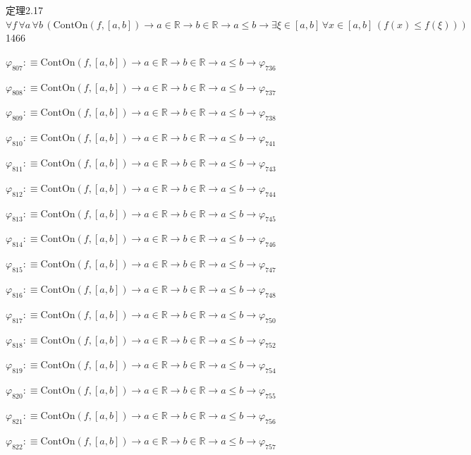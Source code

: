 \begin{fullproof}{定理2.17}{$\forall f\,\forall a\,\forall b\,(\mathrm{ContOn}(f,[a,b]) \to a \in \mathbb{R} \to b \in \mathbb{R} \to a \leq b \to \exists \xi \in [a,b]\,\forall x \in [a,b]\,(f(x) \leq f(\xi)))$}{1466}
\begin{abbrevlist}
\item $\varphi_{807} :\equiv \mathrm{ContOn}(f,[a,b]) \to a \in \mathbb{R} \to b \in \mathbb{R} \to a \leq b \to \varphi_{736}$
\item $\varphi_{808} :\equiv \mathrm{ContOn}(f,[a,b]) \to a \in \mathbb{R} \to b \in \mathbb{R} \to a \leq b \to \varphi_{737}$
\item $\varphi_{809} :\equiv \mathrm{ContOn}(f,[a,b]) \to a \in \mathbb{R} \to b \in \mathbb{R} \to a \leq b \to \varphi_{738}$
\item $\varphi_{810} :\equiv \mathrm{ContOn}(f,[a,b]) \to a \in \mathbb{R} \to b \in \mathbb{R} \to a \leq b \to \varphi_{741}$
\item $\varphi_{811} :\equiv \mathrm{ContOn}(f,[a,b]) \to a \in \mathbb{R} \to b \in \mathbb{R} \to a \leq b \to \varphi_{743}$
\item $\varphi_{812} :\equiv \mathrm{ContOn}(f,[a,b]) \to a \in \mathbb{R} \to b \in \mathbb{R} \to a \leq b \to \varphi_{744}$
\item $\varphi_{813} :\equiv \mathrm{ContOn}(f,[a,b]) \to a \in \mathbb{R} \to b \in \mathbb{R} \to a \leq b \to \varphi_{745}$
\item $\varphi_{814} :\equiv \mathrm{ContOn}(f,[a,b]) \to a \in \mathbb{R} \to b \in \mathbb{R} \to a \leq b \to \varphi_{746}$
\item $\varphi_{815} :\equiv \mathrm{ContOn}(f,[a,b]) \to a \in \mathbb{R} \to b \in \mathbb{R} \to a \leq b \to \varphi_{747}$
\item $\varphi_{816} :\equiv \mathrm{ContOn}(f,[a,b]) \to a \in \mathbb{R} \to b \in \mathbb{R} \to a \leq b \to \varphi_{748}$
\item $\varphi_{817} :\equiv \mathrm{ContOn}(f,[a,b]) \to a \in \mathbb{R} \to b \in \mathbb{R} \to a \leq b \to \varphi_{750}$
\item $\varphi_{818} :\equiv \mathrm{ContOn}(f,[a,b]) \to a \in \mathbb{R} \to b \in \mathbb{R} \to a \leq b \to \varphi_{752}$
\item $\varphi_{819} :\equiv \mathrm{ContOn}(f,[a,b]) \to a \in \mathbb{R} \to b \in \mathbb{R} \to a \leq b \to \varphi_{754}$
\item $\varphi_{820} :\equiv \mathrm{ContOn}(f,[a,b]) \to a \in \mathbb{R} \to b \in \mathbb{R} \to a \leq b \to \varphi_{755}$
\item $\varphi_{821} :\equiv \mathrm{ContOn}(f,[a,b]) \to a \in \mathbb{R} \to b \in \mathbb{R} \to a \leq b \to \varphi_{756}$
\item $\varphi_{822} :\equiv \mathrm{ContOn}(f,[a,b]) \to a \in \mathbb{R} \to b \in \mathbb{R} \to a \leq b \to \varphi_{757}$

\end{abbrevlist}
\end{fullproof}
